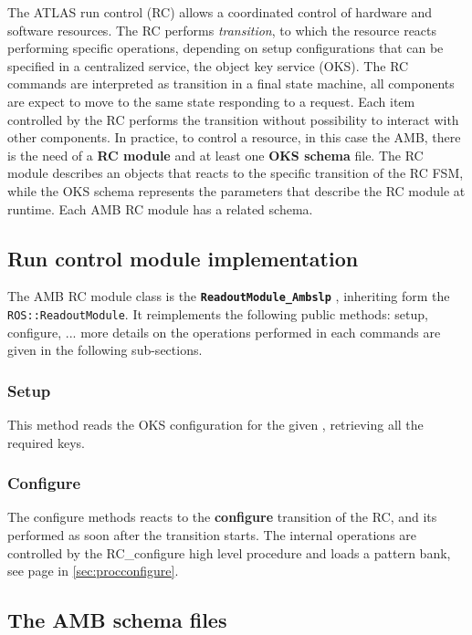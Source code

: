 The ATLAS run control (RC) allows a coordinated control of hardware and software
resources. The RC performs \emph{transition}, to which the resource reacts
performing specific operations, depending on setup configurations that can be
specified in a centralized service, the object key service (OKS). The RC commands
are interpreted as transition in a final state machine, all components are
expect to move to the same state responding to a request. Each item controlled
by the RC performs the transition without possibility to interact with other components.
In practice, to control a resource, in this case the AMB, there is the need of a 
\textbf{RC module} and at least one \textbf{OKS schema} file. The RC module describes
an objects that reacts to the specific transition of the RC FSM, while the OKS
schema represents the parameters that describe the RC module at runtime. Each 
AMB RC module has a related schema.

\subsection{Run control module implementation}
\label{sec:rcmodule}

The AMB RC module class is the \textbf{\texttt{ReadoutModule\_Ambslp}}
,
inheriting
form the \texttt{ROS::ReadoutModule}. It reimplements the following
public methods: setup, configure, ... more details on the operations
performed in each commands are given in the following sub-sections.

\subsubsection{Setup}

This method reads the OKS configuration for the given \AMBoard, 
retrieving all the required keys. 

\subsubsection{Configure} 

The configure methods reacts to the \textbf{configure} transition of the RC,
and its performed as soon after the transition starts. The internal
operations are controlled by the RC\_configure high level procedure and
loads a pattern bank,
see page \pageref{sec:procconfigure} in \ref{sec:procconfigure}.

\subsection{The AMB schema files}

